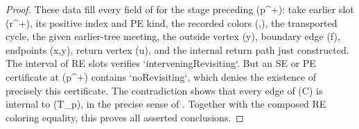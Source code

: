 \begin{proof}
These data fill every field of
 for the stage preceding (p^+):
take earlier slot (r^+), its positive index and PE kind, the recorded colors
(\gamma,\delta), the transported cycle, the given earlier-tree meeting,
the outside vertex (y), boundary edge (f), endpoints (x,y), return
vertex (u), and the internal return path just constructed.  The interval of
RE slots verifies `interveningRevisiting`.  But an SE or PE certificate at
(p^+) contains `noRevisiting`, which denies the existence of precisely this
certificate.  The contradiction shows that every edge of (C) is internal
to (T_p), in the precise sense of .  Together with
the composed RE coloring equality, this proves all asserted conclusions.
\end{proof}
